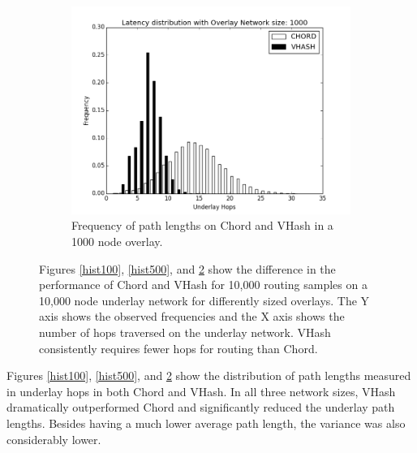 \documentclass[10pt, conference, letterpaper]{IEEEtran}
\begin{document}
\begin{figure}
\begin{subfigure}{\columnwidth}
	\centering
	\includegraphics[width=\linewidth]{hist_1000}
	\caption{Frequency of path lengths on Chord and VHash in a 1000 node overlay.}
	\label{hist1000}
\end{subfigure}

\caption{Figures \ref{hist100}, \ref{hist500}, and \ref{hist1000} show the difference in the performance of Chord and VHash for 10,000 routing samples on a 10,000 node underlay network for differently sized overlays. 
The Y axis shows the observed frequencies and the X axis shows the number of hops traversed on the underlay network.
VHash consistently requires fewer hops for routing than Chord.}


\end{figure}



Figures \ref{hist100}, \ref{hist500}, and \ref{hist1000} show the distribution of path lengths measured in underlay hops in both Chord and VHash.   
In all three network sizes, VHash dramatically outperformed Chord and significantly reduced the underlay path lengths.  
Besides having a much lower average path length, the variance was also considerably lower.
\end{document}
